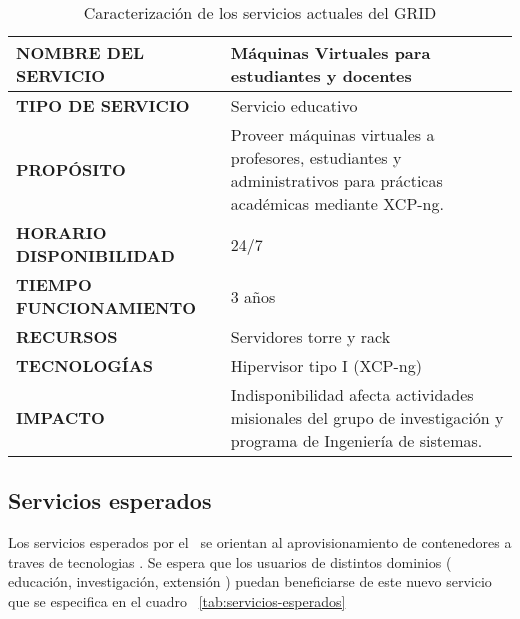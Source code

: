 \begin{table}[H]
\centering
\sffamily\scriptsize %
\setlength{\tabcolsep}{3pt} %
\renewcommand{\arraystretch}{1.1} %
\begin{tabular}{|p{}|p{}|} %
\hline
\textbf{NOMBRE DEL SERVICIO} & Máquinas Virtuales para estudiantes y docentes \\
\hline
\textbf{TIPO DE SERVICIO} & Servicio educativo \\
\hline
\textbf{PROPÓSITO} & Proveer máquinas virtuales a profesores, estudiantes y administrativos para prácticas académicas mediante XCP-ng. \\
\hline
\textbf{HORARIO DISPONIBILIDAD} & 24/7 \\
\hline
\textbf{TIEMPO FUNCIONAMIENTO} & 3 años \\
\hline
\textbf{RECURSOS} & Servidores torre y rack \\
\hline
\textbf{TECNOLOGÍAS} & Hipervisor tipo I (XCP-ng) \\
\hline
\textbf{IMPACTO} & Indisponibilidad afecta actividades misionales del grupo de investigación y programa de Ingeniería de sistemas. \\
\hline
\end{tabular}
\caption{Caracterización de los servicios actuales del GRID}\label{tab:servicios-actuales}
\end{table}

\subsection{Servicios esperados}
\noindent
Los servicios esperados por el \GRID\ se orientan al aprovisionamiento de contenedores a traves de tecnologias \VBC. Se espera que los usuarios de distintos dominios ( educación, investigación, extensión ) puedan beneficiarse de este nuevo servicio que se especifica en el cuadro ~\ref{tab:servicios-esperados}

